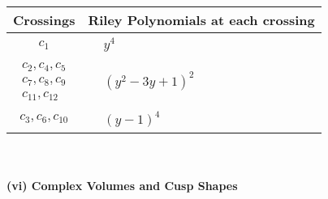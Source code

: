 \documentclass[1p]{elsarticle_modified}
\theoremstyle{definition}
\begin{document}
\begin{tabular}{m{50pt}|m{274pt}}
Crossings & \hspace{64pt}Riley Polynomials at each crossing \\
\hline $$\begin{aligned}c_{1}\end{aligned}$$&$\begin{aligned}
&y^4
\end{aligned}$\\
\hline $$\begin{aligned}c_{2},c_{4},c_{5}\\c_{7},c_{8},c_{9}\\c_{11},c_{12}\end{aligned}$$&$\begin{aligned}
&(y^2-3 y+1)^2
\end{aligned}$\\
\hline $$\begin{aligned}c_{3},c_{6},c_{10}\end{aligned}$$&$\begin{aligned}
&(y-1)^4
\end{aligned}$\\
\hline
\end{tabular}\\~\\
\newpage\flushleft \textbf{(vi) Complex Volumes and Cusp Shapes}
\end{document}
